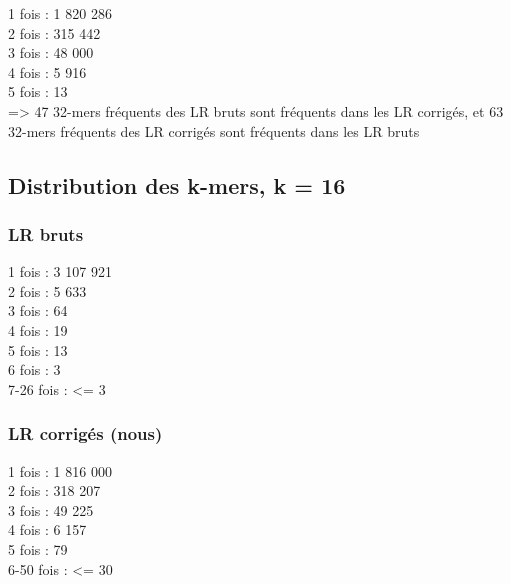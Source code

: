 \documentclass[12pt]{article}
\begin{document}
1 fois : 1 820 286 \\

2 fois : 315 442 \\

3 fois : 48 000 \\

4 fois : 5 916 \\

5 fois : 13 \\

=> 47 32-mers fréquents des LR bruts sont fréquents dans les LR corrigés, et 63 32-mers fréquents des LR corrigés sont fréquents dans les LR bruts

\subsection{Distribution des k-mers, k = 16}

\subsubsection{LR bruts}

1 fois : 3 107 921 \\

2 fois : 5 633 \\

3 fois : 64 \\

4 fois : 19 \\

5 fois : 13 \\

6 fois : 3 \\

7-26 fois : <= 3 \\

\subsubsection{LR corrigés (nous)}

1 fois : 1 816 000 \\

2 fois : 318 207 \\

3 fois : 49 225 \\

4 fois : 6 157 \\

5 fois : 79 \\

6-50 fois : <= 30 \\
\end{document}
